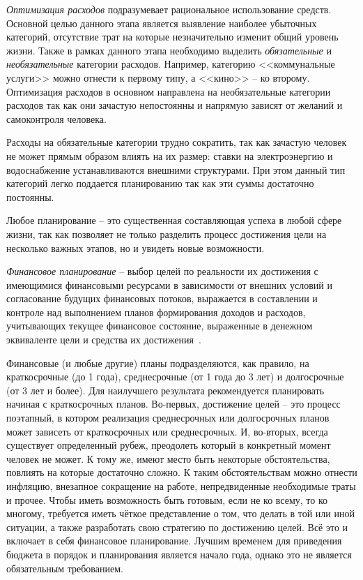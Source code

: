 \emph{Оптимизация расходов} подразумевает рациональное использование средств.
Основной целью данного этапа является выявление наиболее убыточных категорий, отсутствие трат на которые незначительно изменит общий уровень жизни. Также в рамках данного этапа необходимо выделить \emph{обязательные} и \emph{необязательные} категории расходов.
Например, категорию <<коммунальные услуги>> можно отнести к первому типу, а <<кино>> -- ко второму.
Оптимизация расходов в основном направлена на необязательные категории расходов так как они зачастую непостоянны и напрямую зависят от желаний и самоконтроля человека.

Расходы на обязательные категории трудно сократить, так как зачастую человек не может прямым образом влиять на их размер: ставки на электроэнергию и водоснабжение устанавливаются внешними структурами.
При этом данный тип категорий легко поддается планированию так как эти суммы достаточно постоянны.

Любое планирование -- это существенная составляющая успеха в любой сфере жизни, так как позволяет не только разделить процесс достижения цели на несколько важных этапов, но и увидеть новые возможности.

\emph{Финансовое планирование} -- выбор целей по реальности их достижения с имеющимися финансовыми ресурсами в зависимости от внешних условий и согласование будущих финансовых потоков, выражается в составлении и контроле над выполнением планов формирования доходов и расходов, учитывающих текущее финансовое состояние, выраженные в денежном эквиваленте цели и средства их достижения~\cite{finance_planning}.

Финансовые (и любые другие) планы подразделяются, как правило, на краткосрочные (до 1 года), среднесрочные (от 1 года до 3 лет) и долгосрочные (от 3 лет и более).
Для наилучшего результата рекомендуется планировать начиная с краткосрочных планов.
Во-первых, достижение целей -- это процесс поэтапный, в котором реализация среднесрочных или долгосрочных планов может зависеть от краткосрочных или среднесрочных.
И, во-вторых, всегда существует определенный рубеж, преодолеть который в конкретный момент человек не может.
К тому же, имеют место быть некоторые обстоятельства, повлиять на которые достаточно сложно.
К таким обстоятельствам можно отнести инфляцию, внезапное сокращение на работе, непредвиденные необходимые траты и прочее.
Чтобы иметь возможность быть готовым, если не ко всему, то ко многому, требуется иметь чёткое представление о том, что делать в той или иной ситуации, а также разработать свою стратегию по достижению целей.
Всё это и включает в себя финансовое планирование.
Лучшим временем для приведения бюджета в порядок и планирования является начало года, однако это не является обязательным требованием.

